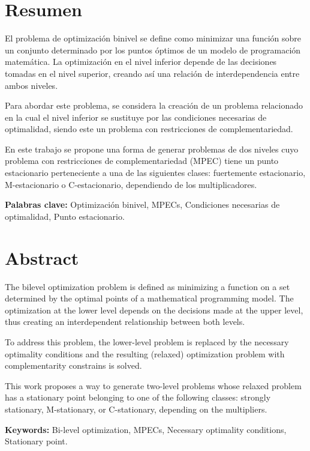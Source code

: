 \chapter*{Resumen}

El problema de optimización binivel se define como minimizar una función sobre un conjunto determinado por los puntos óptimos de un modelo de programación matemática. La optimización en el nivel inferior depende de las decisiones tomadas en el nivel superior, creando así una relación de interdependencia entre ambos niveles.

Para abordar este problema, se considera la creación de un problema relacionado en la cual el nivel inferior se sustituye por las condiciones necesarias de optimalidad, siendo este un problema con restricciones de complementariedad.

En este trabajo se propone una forma de generar problemas de dos niveles cuyo problema con restricciones de complementariedad (MPEC) tiene un punto estacionario perteneciente a una de las siguientes 
clases: fuertemente estacionario, M-estacionario o C-estacionario, dependiendo de los multiplicadores.


\textbf{Palabras clave:} Optimización binivel, MPECs, Condiciones necesarias de optimalidad, Punto estacionario.

\chapter*{Abstract}
The bilevel optimization problem is defined as minimizing a function on a set determined by the optimal points of a mathematical programming model. The optimization at the lower level depends on the decisions made at the upper level, thus creating an interdependent relationship between both levels.

To address this problem, the lower-level problem is replaced by the necessary optimality conditions and the resulting (relaxed) optimization problem with complementarity constrains is solved.

This work proposes a way to generate two-level problems whose relaxed problem has a stationary point belonging to one of the following classes: strongly stationary, M-stationary, or C-stationary, depending on the multipliers.

\textbf{Keywords:} Bi-level optimization, MPECs, Necessary optimality conditions, Stationary point.
